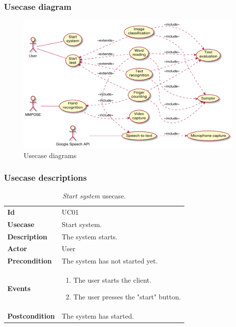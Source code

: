 \subsubsection{Usecase diagram}
\begin{figure}[h!t]
    \centering
    \includegraphics[scale=0.55]{assets/plantuml/pdf/diagram.pdf}
    \caption{Usecase diagrams}
    \label{fig:usecase:diagram}
\end{figure}

\clearpage
\subsubsection{Usecase descriptions}
\begin{table}[h!t]
    \centering
    \caption{\emph{Start system} usecase.}
    \label{tab:uc:system}
    \centering
    \begin{tabular}{l | p{80mm}}
        \textbf{Id}            & UC01                            \\
        \textbf{Usecase}       & Start system.                   \\
        \textbf{Description}   & The system starts.              \\
        \textbf{Actor}         & User                            \\
        \textbf{Precondition}  & The system has not started yet. \\
        \textbf{Events}        & \begin{enumerate}
            \item The user starts the client.
            \item The user presses the "start" button.
        \end{enumerate}      \\
        \textbf{Postcondition} & The system has started.
    \end{tabular}
\end{table}


